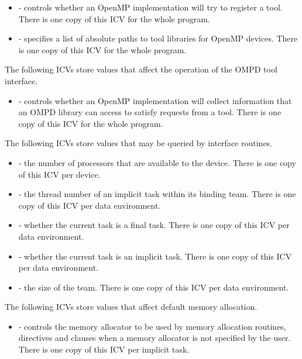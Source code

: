 \begin{itemize}
\item {} - controls whether an OpenMP implementation will try to register 
      a tool. There is one copy of this ICV for the whole program.
\item {} - specifies a list of absolute paths to tool libraries 
      for OpenMP devices. There is one copy of this ICV for the whole program.
\end{itemize}

The following ICVs store values that affect the operation of the OMPD tool interface.

\begin{itemize}
\item {} - controls whether an OpenMP implementation will collect
      information that an OMPD library can access to satisfy requests from
      a tool. There is one copy of this ICV for the whole program.
\end{itemize}

The following ICVs store values that may be queried by interface routines.

\begin{itemize}
\item {} - the number of processors that are available to the device.
      There is one copy of this ICV per device.
\item {} - the thread number of an implicit task within its binding
      team. There is one copy of this ICV per data environment.
\item {} - whether the current task is a final task. There is one copy
      of this ICV per data environment.
\item {} - whether the current task is an implicit task. There is
      one copy of this ICV per data environment.
\item {} - the size of the team. There is one copy of this ICV
      per data environment.
\end{itemize}

The following ICVs store values that affect default memory allocation.

\begin{itemize}
\item {} - controls the memory allocator to be used by 
      memory allocation routines, directives and clauses when a memory allocator 
      is not specified by the user. There is one copy of this ICV per implicit task.
\end{itemize}



